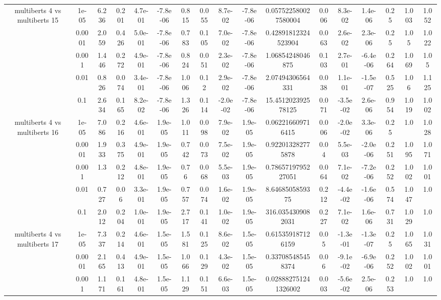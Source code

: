 \begin{tabular}{|c|c|c|c|c|c|c|c|c|c|c|c|c|c|c|c|c|}
\hline
\multirow{5}{*}{multiberts 4 vs multiberts 15} & 1e-05 & 6.236 & 0.201 & 4.7e-01 & -7.8e-06 & 0.815 & 0.055 & 8.7e-02 & -7.8e-06 & 0.057522580027580004 & 0.006 & 8.3e-02 & 1.4e-06 & 0.25 & 1.003 & 1.052 \\
 & 0.0001 & 2.059 & 0.426 & 5.0e-01 & -7.8e-06 & 0.783 & 0.105 & 7.0e-02 & -7.8e-06 & 0.42891812324523904 & 0.063 & 2.6e-02 & 2.3e-06 & 0.25 & 1.05 & 1.022 \\
 & 0.001 & 1.446 & 0.272 & 4.9e-01 & -7.8e-06 & 0.824 & 0.051 & 2.3e-02 & -7.8e-06 & 1.06854248046875 & 0.103 & 2.7e-01 & -6.4e-06 & 0.264 & 1.069 & 1.05 \\
 & 0.01 & 0.826 & 0.074 & 3.4e-01 & -7.8e-06 & 1.006 & 0.12 & 2.9e-02 & -7.8e-06 & 2.07494306564331 & 0.038 & 1.1e-01 & -1.5e-07 & 0.525 & 1.06 & 1.125 \\
 & 0.1 & 2.634 & 0.165 & 8.2e-02 & -7.8e-06 & 1.326 & 0.114 & -2.0e-02 & -7.8e-06 & 15.451202392578125 & 0.071 & -3.5e-02 & 2.6e-06 & 0.954 & 1.019 & 1.002 \\
\hline
\multirow{5}{*}{multiberts 4 vs multiberts 16} & 1e-05 & 7.086 & 0.216 & 4.6e-01 & 1.9e-05 & 1.011 & 0.098 & 7.9e-02 & 1.9e-05 & 0.062216609716415 & 0.006 & -2.0e-02 & 3.3e-06 & 0.25 & 1.0 & 1.028 \\
 & 0.0001 & 1.933 & 0.375 & 4.9e-01 & 1.9e-05 & 0.742 & 0.073 & 7.5e-02 & 1.9e-05 & 0.922013282775878 & 0.04 & 5.5e-03 & -2.0e-06 & 0.251 & 1.095 & 1.071 \\
 & 0.001 & 1.3 & 0.212 & 4.8e-01 & 1.9e-05 & 0.76 & 0.068 & 5.5e-03 & 1.9e-05 & 0.7865719795227051 & 0.064 & 7.1e-02 & -7.2e-06 & 0.252 & 1.002 & 1.001 \\
 & 0.01 & 0.727 & 0.06 & 3.3e-01 & 1.9e-05 & 0.757 & 0.074 & 1.6e-02 & 1.9e-05 & 8.6468505859375 & 0.212 & -4.4e-02 & -1.6e-06 & 0.574 & 1.047 & 1.0 \\
 & 0.1 & 2.012 & 0.204 & 1.0e-01 & 1.9e-05 & 2.717 & 0.141 & 1.0e-02 & 1.9e-05 & 316.0354309082031 & 0.227 & 7.1e-02 & 1.6e-06 & 0.731 & 1.029 & 1.0 \\
\hline
\multirow{5}{*}{multiberts 4 vs multiberts 17} & 1e-05 & 7.337 & 0.214 & 4.6e-01 & 1.5e-05 & 1.581 & 0.125 & 8.6e-02 & 1.5e-05 & 0.615359187126159 & 0.05 & -1.3e-01 & -1.3e-07 & 0.25 & 1.065 & 1.031 \\
 & 0.0001 & 2.165 & 0.413 & 4.9e-01 & 1.5e-05 & 1.066 & 0.129 & 4.3e-02 & 1.5e-05 & 0.337085485458374 & 0.06 & -9.1e-02 & -6.9e-06 & 0.252 & 1.002 & 1.001 \\
 & 0.001 & 1.171 & 0.161 & 4.8e-01 & 1.5e-05 & 1.129 & 0.151 & 6.6e-03 & 1.5e-05 & 0.028882751241326002 & 0.003 & -5.6e-02 & 2.5e-06 & 0.253 & 1.0 & 1.0 \\

\end{tabular}
